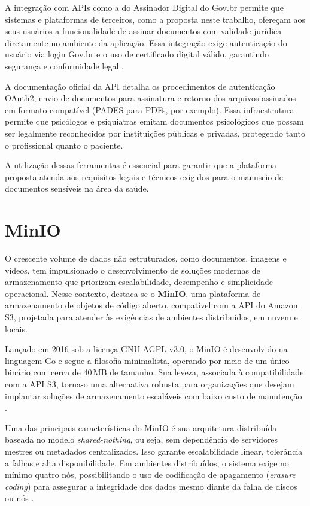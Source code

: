 A integração com APIs como a do Assinador Digital do Gov.br permite que sistemas e plataformas de terceiros, como a proposta neste trabalho, ofereçam aos seus usuários a funcionalidade de assinar documentos com validade jurídica diretamente no ambiente da aplicação. Essa integração exige autenticação do usuário via login Gov.br e o uso de certificado digital válido, garantindo segurança e conformidade legal \cite{iti2023assinatura}.

A documentação oficial da API detalha os procedimentos de autenticação OAuth2, envio de documentos para assinatura e retorno dos arquivos assinados em formato compatível (PADES para PDFs, por exemplo). Essa infraestrutura permite que psicólogos e psiquiatras emitam documentos psicológicos que possam ser legalmente reconhecidos por instituições públicas e privadas, protegendo tanto o profissional quanto o paciente.

A utilização dessas ferramentas é essencial para garantir que a plataforma proposta atenda aos requisitos legais e técnicos exigidos para o manuseio de documentos sensíveis na área da saúde.

\section{MinIO}

O crescente volume de dados não estruturados, como documentos, imagens e vídeos, tem impulsionado o desenvolvimento de soluções modernas de armazenamento que priorizam escalabilidade, desempenho e simplicidade operacional. Nesse contexto, destaca-se o \textbf{MinIO}, uma plataforma de armazenamento de objetos de código aberto, compatível com a API do Amazon S3, projetada para atender às exigências de ambientes distribuídos, em nuvem e locais.

Lançado em 2016 sob a licença GNU AGPL v3.0, o MinIO é desenvolvido na linguagem Go e segue a filosofia minimalista, operando por meio de um único binário com cerca de 40\,MB de tamanho. Sua leveza, associada à compatibilidade com a API S3, torna-o uma alternativa robusta para organizações que desejam implantar soluções de armazenamento escaláveis com baixo custo de manutenção \cite{minio_doc}.

Uma das principais características do MinIO é sua arquitetura distribuída baseada no modelo \textit{shared-nothing}, ou seja, sem dependência de servidores mestres ou metadados centralizados. Isso garante escalabilidade linear, tolerância a falhas e alta disponibilidade. Em ambientes distribuídos, o sistema exige no mínimo quatro nós, possibilitando o uso de codificação de apagamento (\textit{erasure coding}) para assegurar a integridade dos dados mesmo diante da falha de discos ou nós \cite{gill2025}.

